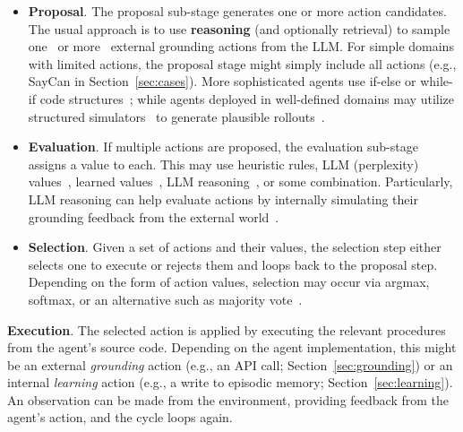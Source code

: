 \documentclass[10pt]{article} %
\begin{document}
\begin{itemize}
\item \textbf{Proposal}. The proposal sub-stage generates one or more action candidates. The usual approach is to use \textbf{reasoning} (and optionally retrieval) to sample one~\citep{inner2022huang} or more~\citep{chen2021evaluating, wang2022self} external grounding actions from the LLM. For simple domains with limited actions, the proposal stage might simply include all actions (e.g., SayCan in Section~\ref{sec:cases}). More sophisticated agents use if-else or while-if code structures~\citep{wang2023voyager, park2023generative}; while agents deployed in well-defined domains may utilize structured simulators~\citep{haslum2019introduction} to generate plausible rollouts~\citep{liu2023llm+, dagan2023dynamic}.

\item \textbf{Evaluation}. If multiple actions are proposed, the evaluation sub-stage assigns a value to each. This may use heuristic rules, LLM (perplexity) values~\citep{ahn2022can}, learned values~\citep{yao2020keep}, LLM reasoning~\citep{yao2023tree, hao2023reasoning}, or some combination. Particularly, LLM reasoning can help evaluate actions by internally simulating their grounding feedback from the external world~\citep{hao2023reasoning, yang2023intercode}. 

\item \textbf{Selection}. Given a set of actions and their values, the selection step either selects one to execute or rejects them and loops back to the proposal step. Depending on the form of action values, selection may occur via argmax, softmax, or an alternative such as majority vote~\citep{wang2022self}.
\end{itemize}

\textbf{Execution}. The selected action is applied by executing the relevant procedures from the agent's source code. Depending on the agent implementation, this might be an external \emph{grounding} action (e.g., an API call; Section~\ref{sec:grounding}) or an internal \emph{learning} action (e.g., a write to episodic memory; Section~\ref{sec:learning}). An observation can be made from the environment, providing feedback from the agent's action, and the cycle loops again. 
\end{document}
